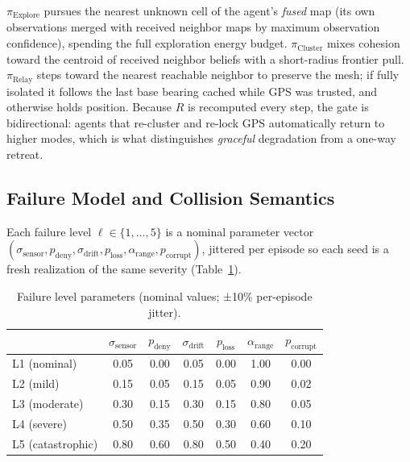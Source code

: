 \documentclass[12pt,a4paper]{article}
\begin{document}
$\pi_{\mathrm{Explore}}$ pursues the nearest unknown cell of the agent's
\emph{fused} map (its own observations merged with received neighbor maps by
maximum observation confidence), spending the full exploration energy budget.
$\pi_{\mathrm{Cluster}}$ mixes cohesion toward the centroid of received
neighbor beliefs with a short-radius frontier pull. $\pi_{\mathrm{Relay}}$
steps toward the nearest reachable neighbor to preserve the mesh; if fully
isolated it follows the last base bearing cached while GPS was trusted, and
otherwise holds position. Because $R$ is recomputed every step, the gate is
bidirectional: agents that re-cluster and re-lock GPS automatically return to
higher modes, which is what distinguishes \emph{graceful} degradation from a
one-way retreat.

\subsection{Failure Model and Collision Semantics}

Each failure level $\ell \in \{1,\dots,5\}$ is a nominal parameter vector
$(\sigma_{\mathrm{sensor}}, p_{\mathrm{deny}}, \sigma_{\mathrm{drift}},
p_{\mathrm{loss}}, \alpha_{\mathrm{range}}, p_{\mathrm{corrupt}})$, jittered
per episode so each seed is a fresh realization of the same severity
(Table~\ref{tab:failure}).

\begin{table}[h]
\centering
\caption{Failure level parameters (nominal values; ±10\% per-episode jitter).}
\label{tab:failure}
\small
\begin{tabular}{lcccccc}
\toprule
 & $\sigma_{\mathrm{sensor}}$ & $p_{\mathrm{deny}}$ & $\sigma_{\mathrm{drift}}$ & $p_{\mathrm{loss}}$ & $\alpha_{\mathrm{range}}$ & $p_{\mathrm{corrupt}}$ \\
\midrule
L1 (nominal)      & 0.05 & 0.00 & 0.05 & 0.00 & 1.00 & 0.00 \\
L2 (mild)         & 0.15 & 0.05 & 0.15 & 0.05 & 0.90 & 0.02 \\
L3 (moderate)     & 0.30 & 0.15 & 0.30 & 0.15 & 0.80 & 0.05 \\
L4 (severe)       & 0.50 & 0.35 & 0.50 & 0.30 & 0.60 & 0.10 \\
L5 (catastrophic) & 0.80 & 0.60 & 0.80 & 0.50 & 0.40 & 0.20 \\
\bottomrule
\end{tabular}
\end{table}
\end{document}
